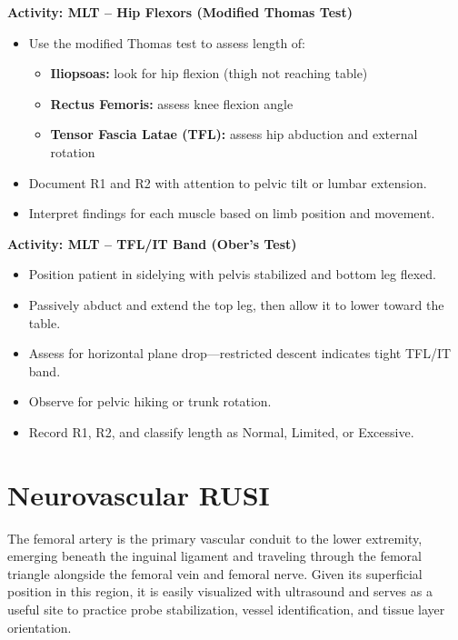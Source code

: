\begin{labactivitybox}
\textbf{Activity: MLT – Hip Flexors (Modified Thomas Test)}

\begin{itemize}
  \item Use the modified Thomas test to assess length of:
  \begin{itemize}
    \item \textbf{Iliopsoas:} look for hip flexion (thigh not reaching table)
    \item \textbf{Rectus Femoris:} assess knee flexion angle
    \item \textbf{Tensor Fascia Latae (TFL):} assess hip abduction and external rotation
  \end{itemize}
  \item Document R1 and R2 with attention to pelvic tilt or lumbar extension.
  \item Interpret findings for each muscle based on limb position and movement.
\end{itemize}
\end{labactivitybox}

\begin{labactivitybox}
\textbf{Activity: MLT – TFL/IT Band (Ober’s Test)}

\begin{itemize}
  \item Position patient in sidelying with pelvis stabilized and bottom leg flexed.
  \item Passively abduct and extend the top leg, then allow it to lower toward the table.
  \item Assess for horizontal plane drop—restricted descent indicates tight TFL/IT band.
  \item Observe for pelvic hiking or trunk rotation.
  \item Record R1, R2, and classify length as Normal, Limited, or Excessive.
\end{itemize}
\end{labactivitybox}

\section*{Neurovascular RUSI}

The femoral artery is the primary vascular conduit to the lower extremity, emerging beneath the inguinal ligament and traveling through the femoral triangle alongside the femoral vein and femoral nerve. Given its superficial position in this region, it is easily visualized with ultrasound and serves as a useful site to practice probe stabilization, vessel identification, and tissue layer orientation.

